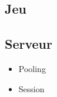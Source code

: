 \subsection{Jeu}

\subsection{Serveur}
	\begin{itemize}
		\item{Pooling}
		\item{Session}
	\end{itemize}